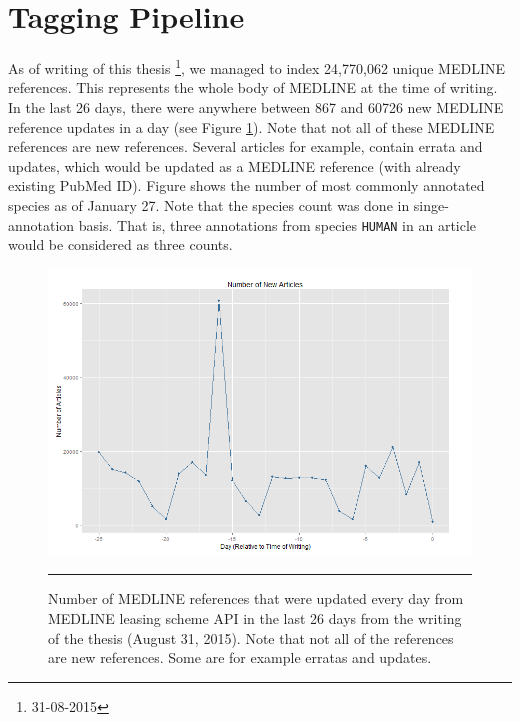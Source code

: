 \section{Tagging Pipeline}

As of writing of this thesis \footnote{31-08-2015}, we managed to index 24,770,062 unique MEDLINE references. This represents the whole body of MEDLINE at the time of writing. In the last 26 days, there were anywhere between 867 and 60726 new MEDLINE reference updates in a day (see Figure \ref{fig:NewArticles}). Note that not all of these MEDLINE references are new references. Several articles for example, contain errata and updates, which would be updated as a MEDLINE reference (with already existing PubMed ID). Figure shows the number of most commonly annotated species as of January 27. Note that the species count was done in singe-annotation basis. That is, three annotations from species \texttt{HUMAN} in an article would be considered as three counts.

\begin{figure}[htbp]
	\centering
    \includegraphics[width=6in]{Figures/NewArticles.png}
    \rule{35em}{0.5pt}
  \caption[Number of incoming MEDLINE updates]{Number of MEDLINE references that were updated every day from MEDLINE leasing scheme API in the last 26 days from the writing of the thesis (August 31, 2015). Note that not all of the references are new references. Some are for example erratas and updates.}
  \label{fig:NewArticles}
\end{figure}


